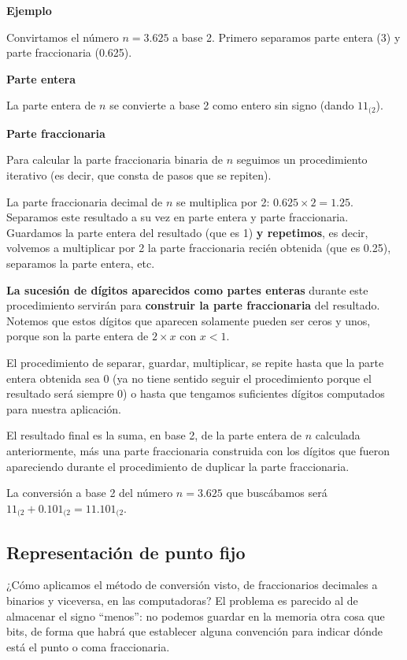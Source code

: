 \documentclass[spanish,A4,]{article}
\begin{document}
\textbf{Ejemplo}

Convirtamos el número $n = 3.625$ a base 2. Primero separamos parte
entera (3) y parte fraccionaria (0.625).

\textbf{Parte entera}

La parte entera de $n$ se convierte a base 2 como entero sin signo
(dando $11_{(2}$).

\textbf{Parte fraccionaria}

Para calcular la parte fraccionaria binaria de $n$ seguimos un
procedimiento iterativo (es decir, que consta de pasos que se repiten).

La parte fraccionaria decimal de $n$ se multiplica por 2:
$0.625 \times 2 = 1.25$. Separamos este resultado a su vez en parte
entera y parte fraccionaria. Guardamos la parte entera del resultado
(que es 1) \textbf{y repetimos}, es decir, volvemos a multiplicar por 2
la parte fraccionaria recién obtenida (que es 0.25), separamos la parte
entera, etc.

\textbf{La sucesión de dígitos aparecidos como partes enteras} durante
este procedimiento servirán para \textbf{construir la parte
fraccionaria} del resultado. Notemos que estos dígitos que aparecen
solamente pueden ser ceros y unos, porque son la parte entera de
$2\times x$ con $x < 1$.

El procedimiento de separar, guardar, multiplicar, se repite hasta que
la parte entera obtenida sea 0 (ya no tiene sentido seguir el
procedimiento porque el resultado será siempre 0) o hasta que tengamos
suficientes dígitos computados para nuestra aplicación.

El resultado final es la suma, en base 2, de la parte entera de $n$
calculada anteriormente, más una parte fraccionaria construida con los
dígitos que fueron apareciendo durante el procedimiento de duplicar la
parte fraccionaria.

La conversión a base 2 del número $n = 3.625$ que buscábamos será
$11_{(2} + 0.101_{(2} = 11.101_{(2}$.

\subsection{Representación de punto
fijo}\label{representaciuxf3n-de-punto-fijo}

¿Cómo aplicamos el método de conversión visto, de fraccionarios
decimales a binarios y viceversa, en las computadoras? El problema es
parecido al de almacenar el signo ``menos'': no podemos guardar en la
memoria otra cosa que bits, de forma que habrá que establecer alguna
convención para indicar dónde está el punto o coma fraccionaria.
\end{document}
